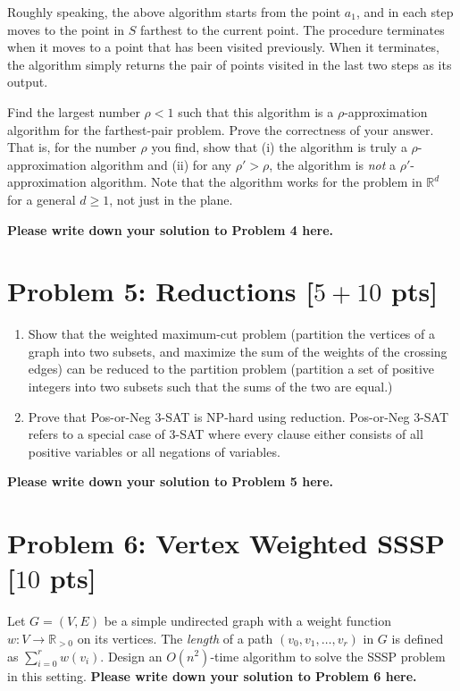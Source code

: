 \documentclass[letterpaper, 11pt]{article}
\newcommand{\1}{\mathds{1}}	%
\theoremstyle{definition}
\newcommand{\problem}[1]{\section*{Problem #1}}
\newenvironment{solution}{{\par\noindent\it Solution.}}{}
\begin{document}
Roughly speaking, the above algorithm starts from the point $a_1$, and in each step moves to the point in $S$ farthest to the current point.
The procedure terminates when it moves to a point that has been visited previously.
When it terminates, the algorithm simply returns the pair of points visited in the last two steps as its output.

Find the largest number $\rho < 1$ such that this algorithm is a $\rho$-approximation algorithm for the farthest-pair problem.
Prove the correctness of your answer.
That is, for the number $\rho$ you find, show that (i) the algorithm is truly a $\rho$-approximation algorithm and (ii) for any $\rho' > \rho$, the algorithm is \textit{not} a $\rho'$-approximation algorithm.
Note that the algorithm works for the problem in $\mathbb{R}^d$ for a general $d \geq 1$, not just in the plane.

\begin{solution}
\textbf{Please write down your solution to Problem 4 here.}
\end{solution}
\clearpage


\problem{5: Reductions [$5 + 10$ pts]}
\begin{enumerate}
    \item Show that the weighted maximum-cut problem (partition the vertices of a graph into two subsets, and maximize the sum of the weights of the crossing edges) can be reduced to the partition problem (partition a set of positive integers into two subsets such that the sums of the two are equal.)

    \item Prove that Pos-or-Neg 3-SAT is NP-hard using reduction. Pos-or-Neg 3-SAT refers to a special case of 3-SAT where every clause either consists of all positive variables or all negations of variables.
\end{enumerate}
\begin{solution}
\textbf{Please write down your solution to Problem 5 here.}
\end{solution}
\clearpage


\problem{6: Vertex Weighted SSSP [$10$ pts]}
Let $G = (V,E)$ be a simple undirected graph with a weight function $w: V \rightarrow \mathbb{R}_{> 0}$ on its vertices.
The \textit{length} of a path $(v_0,v_1,\dots,v_r)$ in $G$ is defined as $\sum_{i=0}^r w(v_i)$.
Design an $O(n^2)$-time algorithm to solve the SSSP problem in this setting.
\begin{solution}
\textbf{Please write down your solution to Problem 6 here.}
\end{solution}
\clearpage
\end{document}
